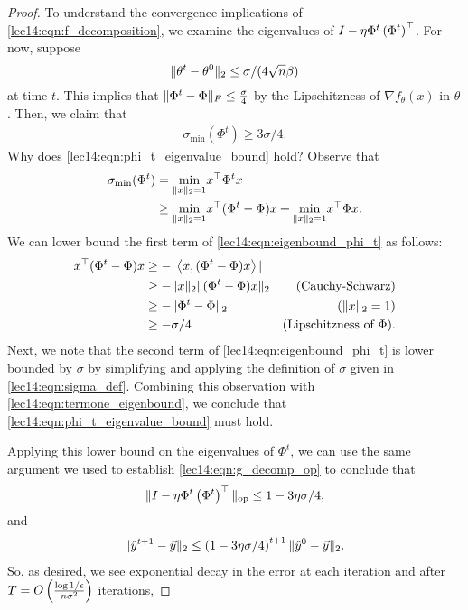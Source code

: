 \begin{proof}
To understand the convergence implications of \eqref{lec14:eqn:f_decomposition}, we examine the eigenvalues of $I - \eta \Phi^t \left(\Phi^t\right)^\top$. For now, suppose 
\begin{equation}
    \|\theta^t - \theta^0\|_2 \leq \sigma/(4\sqrt{n}\beta)
\end{equation} 
at time $t$. This implies that $\|\Phi^t - \Phi\|_F \leq \frac{\sigma}{4}$ by the Lipschitzness of $\nabla f_\theta(x)$ in $\theta$. Then, we claim that 
\begin{align}
    \sigma_{\text{min}}(\Phi^t) \geq 3\sigma/4. \label{lec14:eqn:phi_t_eigenvalue_bound}
\end{align}
Why does \eqref{lec14:eqn:phi_t_eigenvalue_bound} hold? Observe that
\begin{align}
    \sigma_\text{min}(\Phi^t) &= \underset{\|x\|_2=1}{\text{min}} x^\top \Phi^tx \\
   &\geq \underset{\|x\|_2=1}{\text{min}} x^\top (\Phi^t - \Phi)x + \underset{\|x\|_2=1}{\text{min}}  x^\top \Phi x. \label{lec14:eqn:eigenbound_phi_t}
\end{align}
We can lower bound the first term of \eqref{lec14:eqn:eigenbound_phi_t} as follows:
\begin{align}
    x^\top (\Phi^t - \Phi)x &\geq -|\left<x, (\Phi^t - \Phi)x\right>| \\
    &\geq -\|x\|_2 \|(\Phi^t - \Phi)x\|_2 &\text{(Cauchy-Schwarz)}\\ 
    &\geq -\|\Phi^t - \Phi\|_2 &\text{($\|x\|_2 = 1$)}\\ 
    &\geq -\sigma/4 &\text{(Lipschitzness of $\Phi$)}. \label{lec14:eqn:termone_eigenbound}
\end{align}
Next, we note that the second term of \eqref{lec14:eqn:eigenbound_phi_t} is lower bounded by $\sigma$ by simplifying and applying the definition of $\sigma$ given in \eqref{lec14:eqn:sigma_def}. Combining this observation with \eqref{lec14:eqn:termone_eigenbound}, we conclude that \eqref{lec14:eqn:phi_t_eigenvalue_bound} must hold.

Applying this lower bound on the eigenvalues of $\Phi^t$, we can use the same argument we used to establish \eqref{lec14:eqn:g_decomp_op} to conclude that
\begin{align}
    \|I - \eta \Phi^t \left(\Phi^t\right)^\top\|_{\text{op}} \leq 1 - 3\eta \sigma/4 \label{lec14:eqn:op_norm_bound},
\end{align}
and 
\begin{align}
    \|\hat{y}^{t+1} - \vec{y}\|_{2} \leq \left(1 - 3\eta \sigma/4\right)^{t+1} \|\hat{y}^{0} - \vec{y}\|_{2}.
\end{align}
So, as desired, we see exponential decay in the error at each iteration and after $T = O \left( \frac{\log 1/\epsilon}{n\sigma^2}\right)$ iterations,


\end{proof}
